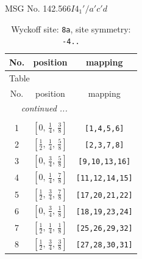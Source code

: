 \documentclass[fleqn,8pt]{jsarticle}
\begin{document}
\setcounter{MaxMatrixCols}{32}

\renewcommand{\tablename}{Table~}
\renewcommand{\figurename}{Figure~}
\begin{center}
\LARGE
MSG No. 142.566\quad$I4_{1}'/a'c'd$
\end{center}
\renewcommand{\arraystretch}{1.2}
\begin{longtable}{ccc}
\caption{Wyckoff site: {\tt 8a}, site symmetry: {\tt -4..}}
 \\
 \hline \hline
No. & position & mapping \\ \hline \endfirsthead

\multicolumn{2}{l}{\tablename\ \thetable{}} \\
 \hline \hline
No. & position & mapping \\ \hline \endhead

 \hline \hline
\multicolumn{2}{r}{\footnotesize\it continued ...} \\ \endfoot

 \hline \hline
\multicolumn{2}{r}{} \\ \endlastfoot

1 & $\left[ 0,\, \frac{1}{4},\, \frac{3}{8} \right]$ & {\tt [1,4,5,6]} \\ \hline
2 & $\left[ \frac{1}{2},\, \frac{1}{4},\, \frac{5}{8} \right]$ & {\tt [2,3,7,8]} \\ \hline
3 & $\left[ 0,\, \frac{3}{4},\, \frac{5}{8} \right]$ & {\tt [9,10,13,16]} \\ \hline
4 & $\left[ 0,\, \frac{1}{4},\, \frac{7}{8} \right]$ & {\tt [11,12,14,15]} \\ \hline
5 & $\left[ \frac{1}{2},\, \frac{3}{4},\, \frac{7}{8} \right]$ & {\tt [17,20,21,22]} \\ \hline
6 & $\left[ 0,\, \frac{3}{4},\, \frac{1}{8} \right]$ & {\tt [18,19,23,24]} \\ \hline
7 & $\left[ \frac{1}{2},\, \frac{1}{4},\, \frac{1}{8} \right]$ & {\tt [25,26,29,32]} \\ \hline
8 & $\left[ \frac{1}{2},\, \frac{3}{4},\, \frac{3}{8} \right]$ & {\tt [27,28,30,31]} \\
\end{longtable}
\renewcommand{\arraystretch}{1.2}
\end{document}
